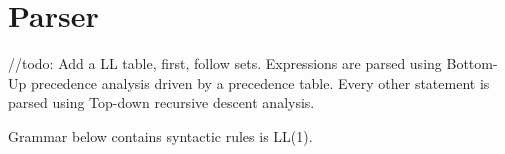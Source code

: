 \section{Parser}

\begin{text}
    //todo: Add a LL table, first, follow sets.\newline
    Expressions are parsed using Bottom-Up precedence analysis driven by a precedence table.
    Every other statement is parsed using Top-down recursive descent analysis.
    
\end{text}

\begin{text}
    Grammar below contains syntactic rules is LL(1).
\end{text}

